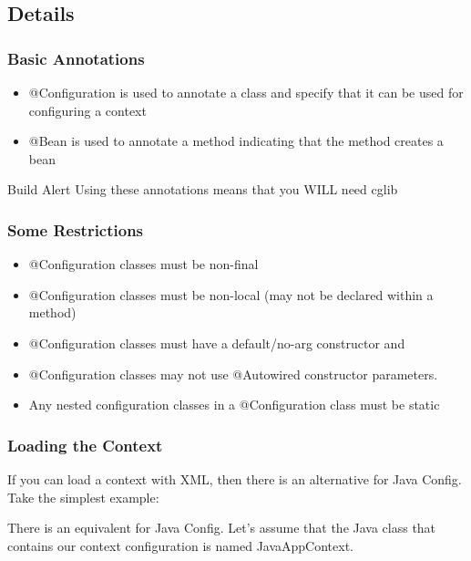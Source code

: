 \documentclass[t,handout]{beamer}
\begin{document}
    \subsection{Details}
        \frame
        {
            \frametitle{Basic Annotations}
            \begin{itemize}
                \item @Configuration is used to annotate a class and specify
                      that it can be used for configuring a context
                \item @Bean is used to annotate a method indicating that the
                      method creates a bean
            \end{itemize}
            \begin{alertblock}{Build Alert}
                Using these annotations means that you WILL need cglib
            \end{alertblock}
        }

        \frame
        {
            \frametitle{Some Restrictions}
            \begin{itemize}
                \item @Configuration classes must be non-final
                \item @Configuration classes must be non-local (may not be
                      declared within a method)
                \item @Configuration classes must have a default/no-arg
                      constructor and 
                \item @Configuration classes may not use @Autowired
                      constructor parameters. 
                \item Any nested configuration classes in a @Configuration
                      class must be static 
            \end{itemize}
        }
        
        \frame
        {
            \frametitle{Loading the Context}
            If you can load a context with XML, then there is an alternative
            for Java Config.  Take the simplest example:
            {\tiny 
                
            }
            
            There is an equivalent for Java Config.  Let's assume that the
            Java class that contains our context configuration is named
            JavaAppContext.
            {\tiny 
                
            }
        }
        
\end{document}
